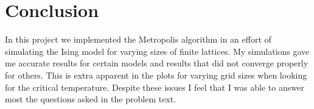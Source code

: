 \section{Conclusion}
\label{sec:conclusion}

In this project we implemented the Metropolis algorithm in an effort of
simulating the Ising model for varying sizes of finite lattices. My simulations
gave me accurate results for certain models and results that did not converge
properly for others. This is extra apparent in the plots for varying grid sizes
when looking for the critical temperature. Despite these issues I feel that I
was able to answer most the questions asked in the problem text.
